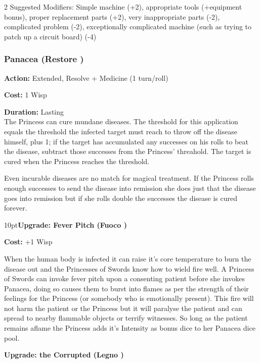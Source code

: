 \begin{multicols}{2}
Suggested Modifiers: Simple machine (+2), appropriate tools (+equipment bonus), proper replacement parts (+2), very inappropriate parts (-2), complicated problem (-2), exceptionally complicated machine (such as trying to patch up a circuit board) (-4)

\subsubsection*{Panacea (Restore \textbullet\textbullet)}

\noindent \textbf{Action:} Extended, Resolve + Medicine (1 turn/roll)

\noindent \textbf{Cost:} 1 Wisp

\noindent \textbf{Duration:} Lasting \\

\noindent The Princess can cure mundane diseases. The threshold for this application equals the threshold the infected target must reach to throw off the disease himself, plus 1; if the target has accumulated any successes on his rolls to beat the disease, subtract those successes from the Princess' threahold. The target is cured when the Princess reaches the threshold.

Even incurable diseases are no match for magical treatment. If the Princess rolls enough successes to send the disease into remission she does just that \textemdash the disease goes into remission \textemdash but if she rolls double the successes the disease is cured forever. 

\begin{myindentpar}{10pt}\textbf{Upgrade: Fever Pitch (Fuoco \textbullet\textbullet)}

\noindent \textbf{Cost:} +1 Wisp

When the human body is infected it can raise it's core temperature to burn the disease out and the Princesses of Swords know how to wield fire well. A Princess of Swords can invoke fever pitch upon a consenting patient before she invokes Panacea, doing so causes them to burst into flames as per the strength of their feelings for the Princess (or somebody who is emotionally present). This fire will not harm the patient or the Princess but it will paralyse the patient and can spread to nearby flammable objects or terrify witnesses. So long as the patient remains aflame the Princess adds it's Intensity as bonus dice to her Panacea dice pool. 

\textbf{Upgrade: the Corrupted (Legno  \textbullet\textbullet\textbullet)}


\end{myindentpar}
\end{multicols}

